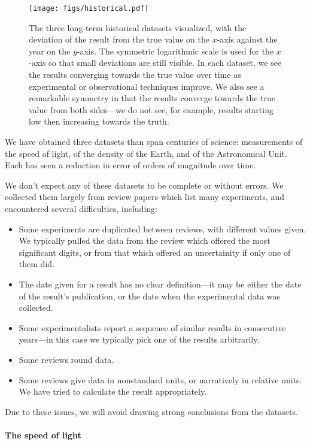 \documentclass[letterpaper,12pt]{article}
\begin{document}
\begin{figure}[htbp]
  \texttt{[image: figs/historical.pdf]}
  \caption{The three long-term historical datasets visualized, with the deviation of the result from the true value on the $x$-axis against the year on the $y$-axis. The symmetric logarithmic scale is used for the $x$-axis so that small deviations are still visible. In each dataset, we see the results converging towards the true value over time as experimental or observational techniques improve. We also see a remarkable symmetry in that the results converge towards the true value from both sides---we do not see, for example, results starting low then increasing towards the truth.}
  \label{fig:historical}
\end{figure}

We have obtained three datasets than span centuries of science: measurements of the speed of light, of the density of the Earth, and of the Astronomical Unit. Each has seen a reduction in error of orders of magnitude over time.

We don't expect any of these datasets to be complete or without errors. We collected them largely from review papers which list many experiments, and encountered several difficulties, including:
\begin{itemize}
  \item Some experiments are duplicated between reviews, with different values given. We typically pulled the data from the review which offered the most significant digits, or from that which offered an uncertainity if only one of them did.
  \item The date given for a result has no clear definition---it may be either the date of the result's publication, or the date when the experimental data was collected.
  \item Some experimentalists report a sequence of similar results in consecutive years---in this case we typically pick one of the results arbitrarily.
  \item Some reviews round data.
  \item Some reviews give data in nonstandard units, or narratively in relative units. We have tried to calculate the result appropriately.
\end{itemize}
Due to these issues, we will avoid drawing strong conclusions from the datasets.

\paragraph{The speed of light}
\end{document}
